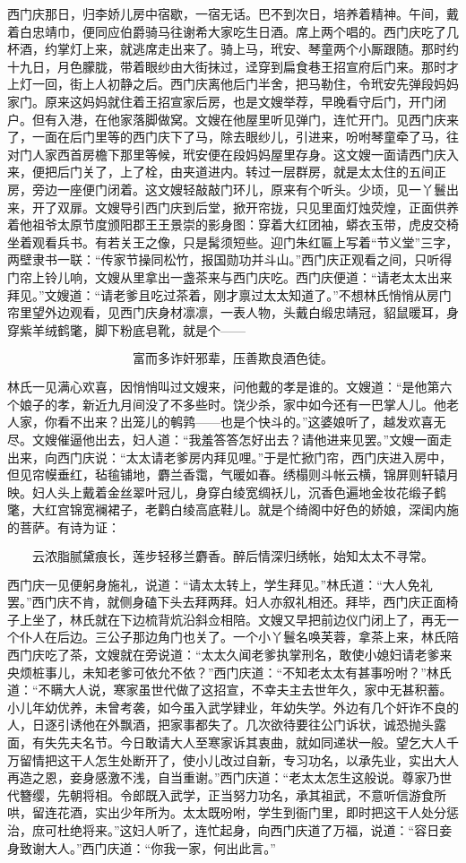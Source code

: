 西门庆那日，归李娇儿房中宿歇，一宿无话。巴不到次日，培养着精神。午间，戴着白忠靖巾，便同应伯爵骑马往谢希大家吃生日酒。席上两个唱的。西门庆吃了几杯酒，约掌灯上来，就逃席走出来了。骑上马，玳安、琴童两个小厮跟随。那时约十九日，月色朦胧，带着眼纱由大街抹过，迳穿到扁食巷王招宣府后门来。那时才上灯一回，街上人初静之后。西门庆离他后门半舍，把马勒住，令玳安先弹段妈妈家门。原来这妈妈就住着王招宣家后房，也是文嫂举荐，早晚看守后门，开门闭户。但有入港，在他家落脚做窝。文嫂在他屋里听见弹门，连忙开门。见西门庆来了，一面在后门里等的西门庆下了马，除去眼纱儿，引进来，吩咐琴童牵了马，往对门人家西首房檐下那里等候，玳安便在段妈妈屋里存身。这文嫂一面请西门庆入来，便把后门关了，上了栓，由夹道进内。转过一层群房，就是太太住的五间正房，旁边一座便门闭着。这文嫂轻敲敲门环儿，原来有个听头。少顷，见一丫鬟出来，开了双扉。文嫂导引西门庆到后堂，掀开帘拢，只见里面灯烛荧煌，正面供养着他祖爷太原节度颁阳郡王王景崇的影身图：穿着大红团袖，蟒衣玉带，虎皮交椅坐着观看兵书。有若关王之像，只是髯须短些。迎门朱红匾上写着“节义堂”三字，两壁隶书一联：“传家节操同松竹，报国勋功并斗山。”西门庆正观看之间，只听得门帘上铃儿响，文嫂从里拿出一盏茶来与西门庆吃。西门庆便道：“请老太太出来拜见。”文嫂道：“请老爹且吃过茶着，刚才禀过太太知道了。”不想林氏悄悄从房门帘里望外边观看，见西门庆身材凛凛，一表人物，头戴白缎忠靖冠，貂鼠暖耳，身穿紫羊绒鹤氅，脚下粉底皂靴，就是个——

\[
富而多诈奸邪辈，压善欺良酒色徒。
\]

林氏一见满心欢喜，因悄悄叫过文嫂来，问他戴的孝是谁的。文嫂道：“是他第六个娘子的孝，新近九月间没了不多些时。饶少杀，家中如今还有一巴掌人儿。他老人家，你看不出来？出笼儿的鹌鹑——也是个快斗的。”这婆娘听了，越发欢喜无尽。文嫂催逼他出去，妇人道：“我羞答答怎好出去？请他进来见罢。”文嫂一面走出来，向西门庆说：“太太请老爹房内拜见哩。”于是忙掀门帘，西门庆进入房中，但见帘幙垂红，毡毺铺地，麝兰香霭，气暖如春。绣榻则斗帐云横，锦屏则轩辕月映。妇人头上戴着金丝翠叶冠儿，身穿白绫宽绸袄儿，沉香色遍地金妆花缎子鹤氅，大红宫锦宽襕裙子，老鹳白绫高底鞋儿。就是个绮阁中好色的娇娘，深闺内施的菩萨。有诗为证：

\[
云浓脂腻黛痕长，莲步轻移兰麝香。
醉后情深归绣帐，始知太太不寻常。
\]

西门庆一见便躬身施礼，说道：“请太太转上，学生拜见。”林氏道：“大人免礼罢。”西门庆不肯，就侧身磕下头去拜两拜。妇人亦叙礼相还。拜毕，西门庆正面椅子上坐了，林氏就在下边梳背炕沿斜佥相陪。文嫂又早把前边仪门闭上了，再无一个仆人在后边。三公子那边角门也关了。一个小丫鬟名唤芙蓉，拿茶上来，林氏陪西门庆吃了茶，文嫂就在旁说道：“太太久闻老爹执掌刑名，敢使小媳妇请老爹来央烦桩事儿，未知老爹可依允不依？”西门庆道：“不知老太太有甚事吩咐？”林氏道：“不瞒大人说，寒家虽世代做了这招宣，不幸夫主去世年久，家中无甚积蓄。小儿年幼优养，未曾考袭，如今虽入武学肄业，年幼失学。外边有几个奸诈不良的人，日逐引诱他在外飘酒，把家事都失了。几次欲待要往公门诉状，诚恐抛头露面，有失先夫名节。今日敢请大人至寒家诉其衷曲，就如同递状一般。望乞大人千万留情把这干人怎生处断开了，使小儿改过自新，专习功名，以承先业，实出大人再造之恩，妾身感激不浅，自当重谢。”西门庆道：“老太太怎生这般说。尊家乃世代簪缨，先朝将相。令郎既入武学，正当努力功名，承其祖武，不意听信游食所哄，留连花酒，实出少年所为。太太既吩咐，学生到衙门里，即时把这干人处分惩治，庶可杜绝将来。”这妇人听了，连忙起身，向西门庆道了万福，说道：“容日妾身致谢大人。”西门庆道：“你我一家，何出此言。”

